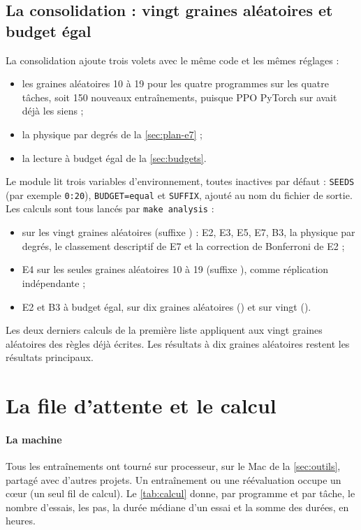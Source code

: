 \subsection{La consolidation : vingt graines aléatoires et budget égal}\label{sec:plan-consolidation}
La consolidation ajoute trois volets avec le même code et les mêmes réglages :
\begin{itemize}
  \item les graines aléatoires 10 à 19 pour les quatre programmes sur les quatre tâches, soit 150 nouveaux
    entraînements, puisque PPO PyTorch sur  avait déjà les siens ;
  \item la physique par degrés de la \cref{sec:plan-e7} ;
  \item la lecture à budget égal de la \cref{sec:budgets}.
\end{itemize}
Le module  lit trois variables d'environnement, toutes inactives par défaut :
\texttt{SEEDS} (par exemple \texttt{0:20}), \texttt{BUDGET=equal} et \texttt{SUFFIX}, ajouté au nom du fichier
de sortie. Les calculs sont tous lancés par \texttt{make analysis} :
\begin{itemize}
  \item sur les vingt graines aléatoires (suffixe ) : E2, E3, E5, E7, B3, la physique par degrés, le
    classement descriptif de E7 et la correction de Bonferroni de E2 ;
  \item E4 sur les seules graines aléatoires 10 à 19 (suffixe ), comme réplication indépendante ;
  \item E2 et B3 à budget égal, sur dix graines aléatoires () et sur vingt ().
\end{itemize}
Les deux derniers calculs de la première liste appliquent aux vingt graines aléatoires des règles déjà
écrites. Les résultats à dix graines aléatoires restent les résultats principaux.

\section{La file d'attente et le calcul}\label{sec:calcul}

\paragraph{La machine}
Tous les entraînements ont tourné sur processeur, sur le Mac de la \cref{sec:outils}, partagé avec d'autres
projets. Un entraînement ou une réévaluation occupe un cœur (un seul fil de calcul). Le
\cref{tab:calcul} donne, par programme et par tâche, le nombre d'essais, les pas, la durée médiane d'un essai et
la somme des durées, en heures.

